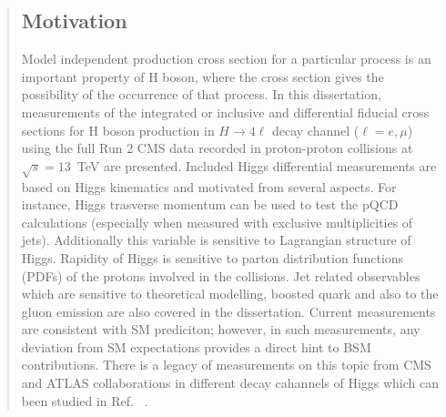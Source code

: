 \begin{abstract}
	\subsection{Motivation}
	Model independent production cross section for a particular process is an important property of H boson, where the cross section gives the possibility of the occurrence of that process.  In this dissertation, measurements of the integrated or inclusive and differential fiducial cross sections for H boson production in $H \rightarrow 4\ell$ decay channel ($\ell = e, \mu$) using the full Run 2 CMS data recorded in proton-proton collisions at $\sqrt{s}=13$~TeV are presented.
Included Higgs differential measurements are based on Higgs kinematics and motivated from several aspects. For instance, Higgs trasverse momentum can be used to test the pQCD calculations (especially when measured with exclusive multiplicities of jets). Additionally this variable is sensitive to Lagrangian structure of Higgs. Rapidity of Higgs is sensitive to parton distribution functions (PDFs) of the protons involved in the collisions. Jet related observables which are sensitive to theoretical modelling, boosted quark and also to the gluon emission are also covered in the dissertation. Current measurements are consistent with SM prediciton; however, in such measurements, any deviation  from SM expectations provides a direct hint to BSM contributions.
There is a legacy of measurements on this topic from CMS and ATLAS collaborations in different decay cahannels of Higgs which can been studied in Ref. ~\cite{Khachatryan:2015yvw, CMS:2015hja, CMS:2016rqf, Sirunyan:2017exp, CMS:2018hhg, ATLAS-CONF-2019-029, CMSHggFiducial8TeV, atlas-conf-2019-025, ATLAS:2018uso, ATLAS-CONF-2019-032, ATLAS:2017myr,  CMS:Hgg_8TeV, CMS:2019chr, Sirunyan:2020xwk}.
	

\end{abstract}

